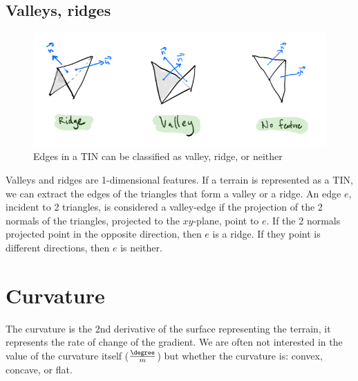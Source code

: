 \subsection{Valleys, ridges}

\begin{figure}
  \centering
  \includegraphics[width=\linewidth]{figs/valley_ridge}
  \caption{Edges in a TIN can be classified as valley, ridge, or neither}%
\label{fig:valley_ridge}
\end{figure}
Valleys and ridges are 1-dimensional features.
If a terrain is represented as a TIN, we can extract the edges of the triangles that form a valley or a ridge.
An edge $e$, incident to 2 triangles, is considered a valley-edge if the projection of the 2 normals of the triangles, projected to the $xy$-plane, point to $e$.
If the 2 normals projected point in the opposite direction, then $e$ is a ridge.
If they point is different directions, then $e$ is neither.



%
\section{Curvature}%

The curvature is the 2nd derivative of the surface representing the terrain, it represents the rate of change of the gradient.%
We are often not interested in the value of the curvature itself ($\frac{\degree}{m}$) but whether the curvature is: convex, concave, or flat.

